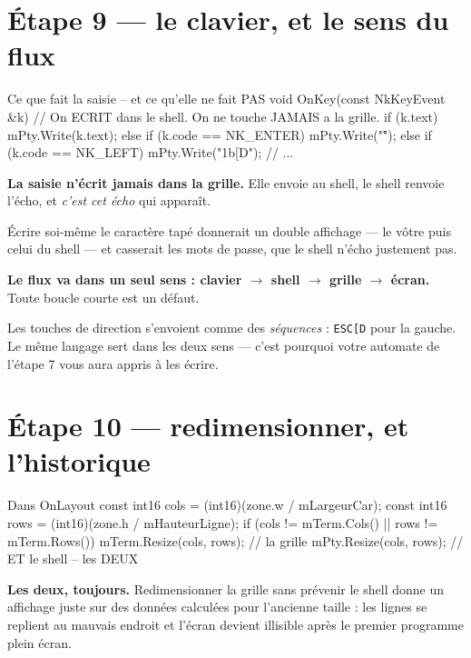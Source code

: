 \section{Étape 9 --- le clavier, et le sens du flux}

\begin{nkcode}{Ce que fait la saisie -- et ce qu'elle ne fait PAS}
void OnKey(const NkKeyEvent &k) {
    // On ECRIT dans le shell. On ne touche JAMAIS a la grille.
    if (k.text) { mPty.Write(k.text); }
    else if (k.code == NK_ENTER)  { mPty.Write("\r"); }
    else if (k.code == NK_LEFT)   { mPty.Write("\x1b[D"); }
    // ...
}
\end{nkcode}

\begin{nkretenir}
\textbf{La saisie n'écrit jamais dans la grille.} Elle envoie au shell, le shell
renvoie l'écho, et \emph{c'est cet écho} qui apparaît.

Écrire soi-même le caractère tapé donnerait un double affichage --- le vôtre puis
celui du shell --- et casserait les mots de passe, que le shell n'écho justement
pas.

\textbf{Le flux va dans un seul sens : clavier $\rightarrow$ shell
$\rightarrow$ grille $\rightarrow$ écran.} Toute boucle courte est un défaut.
\end{nkretenir}

\begin{nkretenir}
Les touches de direction s'envoient comme des \emph{séquences} : \texttt{ESC[D}
pour la gauche. Le même langage sert dans les deux sens --- c'est pourquoi votre
automate de l'étape 7 vous aura appris à les écrire.
\end{nkretenir}

\section{Étape 10 --- redimensionner, et l'historique}

\begin{nkcode}{Dans OnLayout}
const int16 cols = (int16)(zone.w / mLargeurCar);
const int16 rows = (int16)(zone.h / mHauteurLigne);
if (cols != mTerm.Cols() || rows != mTerm.Rows()) {
    mTerm.Resize(cols, rows);   // la grille
    mPty.Resize(cols, rows);    // ET le shell -- les DEUX
}
\end{nkcode}

\begin{nkpiege}
\textbf{Les deux, toujours.} Redimensionner la grille sans prévenir le shell
donne un affichage juste sur des données calculées pour l'ancienne taille : les
lignes se replient au mauvais endroit et l'écran devient illisible après le
premier programme plein écran.
\end{nkpiege}

